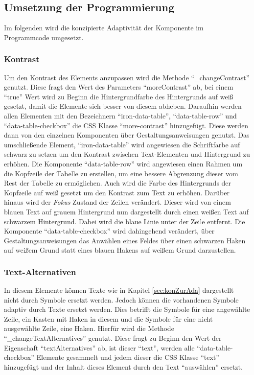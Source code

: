 \documentclass[12pt, paper=a4, bibtotoc, toc=listof, headsepline=true]{scrreprt}
\begin{document}
		\subsection{Umsetzung der Programmierung}
		Im folgenden wird die konzipierte Adaptivität der Komponente im Programmcode umgesetzt.
		\subsubsection{Kontrast}
		Um den Kontrast des Elements anzupassen wird die Methode \enquote{\_changeContrast} genutzt. Diese fragt den Wert des Parameters \enquote{moreContrast} ab, bei einem \enquote{true} Wert wird zu Beginn die Hintergrundfarbe des Hintergrunds auf weiß gesetzt, damit die Elemente sich besser von diesem abheben. Daraufhin werden allen Elementen mit den Bezeichnern \enquote{iron-data-table}, \enquote{data-table-row} und \enquote{data-table-checkbox} die CSS Klasse \enquote{more-contrast} hinzugefügt. Diese werden dann von den einzelnen Komponenten über Gestaltungsanweisungen genutzt. Das umschließende Element, \enquote{iron-data-table} wird angewiesen die Schriftfarbe auf schwarz zu setzen um den Kontrast zwischen Text-Elementen und Hintergrund zu erhöhen. Die Komponente \enquote{data-table-row} wird angewiesen einen Rahmen um die Kopfzeile der Tabelle zu erstellen, um eine bessere Abgrenzung dieser vom Rest der Tabelle zu ermöglichen. Auch wird die Farbe des Hintergrunds der Kopfzeile auf weiß gesetzt um den Kontrast zum Text zu erhöhen. Darüber hinaus wird der \emph{Fokus} Zustand der Zeilen verändert. Dieser wird von einem blauen Text auf grauem Hintergrund nun dargestellt durch einen weißen Text auf schwarzem Hintergrund. Dabei wird die blaue Linie unter der Zeile entfernt. Die Komponente \enquote{data-table-checkbox} wird dahingehend verändert, über Gestaltungsanweisungen das Anwählen eines Feldes über einen schwarzen Haken auf weißem Grund statt eines blauen Hakens auf weißem Grund darzustellen.
		\subsubsection{Text-Alternativen}
		In diesem Elemente können Texte wie in Kapitel \ref{sec:konZurAda} dargestellt nicht durch Symbole ersetzt werden. Jedoch können die vorhandenen Symbole adaptiv durch Texte ersetzt werden. Dies betrifft die Symbole für eine angewählte Zeile, ein Kasten mit Haken in diesem und die Symbole für eine nicht ausgewählte Zeile, eine Haken. Hierfür wird die Methode \enquote{\_changeTextAlternatives} genutzt. Diese fragt zu Beginn den Wert der Eigenschaft \enquote{textAlternatives} ab, ist dieser \enquote{text}, werden alle \enquote{data-table-checkbox} Elemente gesammelt und jedem dieser die CSS Klasse \enquote{text} hinzugefügt und der Inhalt dieses Element durch den Text \enquote{auswählen} ersetzt. 
\end{document}
